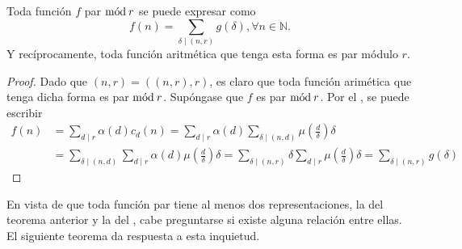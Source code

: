 \begin{theorem}
Toda función $f$ par $\mathrm{m\acute{o}d\:}r$ se puede expresar como
\begin{equation}\label{eq:fou2}
    f(n) = \sum_{\delta \mid (n,r)} g(\delta), \forall n \in \mathbb{N}.
\end{equation}
Y recíprocamente, toda función aritmética que tenga esta forma es par módulo $r$.
\end{theorem}
\begin{proof}
Dado que $(n,r)=((n,r),r)$, es claro que toda función arimética que tenga dicha forma es par $\mathrm{m\acute{o}d\:}r$. Supóngase que $f$ es par $\mathrm{m\acute{o}d\:}r$. Por el , se puede escribir
\begin{align*}
    f(n) & = \sum_{d \mid r} \alpha(d) c_d(n) = \sum_{d \mid r} \alpha(d) \sum_{\delta \mid (n,d)} \mu \left( \frac{d}{\delta} \right) \delta \\
         & = \sum_{\delta \mid (n,d)} \sum_{d \mid r} \alpha(d) \mu \left( \frac{d}{\delta} \right) \delta = \sum_{\delta \mid (n,r)} \delta \sum_{d \mid r} \mu \left( \frac{d}{\delta} \right) \delta = \sum_{\delta \mid (n,r)} g(\delta) 
\end{align*}
\end{proof}

En vista de que toda función par tiene al menos dos representaciones, la del teorema anterior y la del , cabe preguntarse si existe alguna relación entre ellas. El siguiente teorema da respuesta a esta inquietud.

